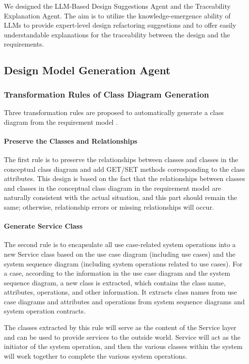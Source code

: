 \documentclass[pdflatex,sn-mathphys-num]{sn-jnl}%
\theoremstyle{thmstyleone}%
\theoremstyle{thmstyletwo}%
\theoremstyle{thmstylethree}%
\begin{document}
We designed the LLM-Based Design Suggestions Agent and the Traceability Explanation Agent. The aim is to utilize the knowledge-emergence ability of LLMs to provide expert-level design refactoring suggestions and to offer easily understandable explanations for the traceability between the design and the requirements.

\subsection{Design Model Generation Agent}
\subsubsection{Transformation Rules of Class Diagram Generation}
Three transformation rules are proposed to automatically generate a class diagram from the requirement model .
\paragraph{Preserve the Classes and Relationships}
The first rule is to preserve the relationships between classes and classes in the conceptual class diagram and add GET/SET methods corresponding to the class attributes. This design is based on the fact that the relationships between classes and classes in the conceptual class diagram in the requirement model are naturally consistent with the actual situation, and this part should remain the same; otherwise, relationship errors or missing relationships will occur.
\paragraph{Generate Service Class}
The second rule is to encapsulate all use case-related system operations into a new Service class based on the use case diagram (including use cases) and the system sequence diagram (including system operations related to use cases). For a case, according to the information in the use case diagram and the system sequence diagram, a new class is extracted, which contains the class name, attributes, operations, and other information. It extracts class names from use case diagrams and attributes and operations from system sequence diagrams and system operation contracts.

The classes extracted by this rule will serve as the content of the Service layer and can be used to provide services to the outside world. Service will act as the initiator of the system operation, and then the various classes within the system will work together to complete the various system operations.
\end{document}
